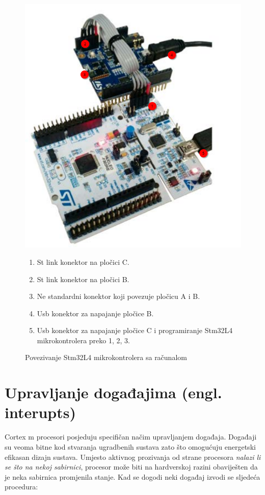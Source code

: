 \documentclass[times, utf8, diplomski]{diplomski}
\begin{document}
\begin{figure}[H]
  \includegraphics[scale=0.5]{connection_img.png}
  \centering
  \caption{Povezivanje Stm32L4 mikrokontrolera sa računalom\cite{gettingstartedsensor}}
  \label{fig:prog}
  \begin{enumerate}
    \item St link konektor na pločici C.
    \item St link konektor na pločici B.
    \item Ne standardni konektor koji povezuje pločicu A i B.
    \item Usb konektor za napajanje pločice B.
    \item Usb konektor za napajanje pločice C i programiranje Stm32L4 mikrokontrolera preko 1, 2, 3.
  \end{enumerate}
\end{figure}

\newpage

\section{Upravljanje događajima (engl. interupts)}
Cortex m procesori posjeduju specifičan načim upravljanjem događaja. Događaji su veoma bitne kod stvaranja ugradbenih sustava zato što omogućuju energetski efikasan dizajn sustava.
Umjesto aktivnog prozivanja od strane procesora \textit{nalazi li se što na nekoj sabirnici}, procesor može biti na hardverskoj razini obaviješten da je neka sabirnica promjenila stanje.
Kad se dogodi neki događaj izvodi se sljedeća procedura:
\end{document}
